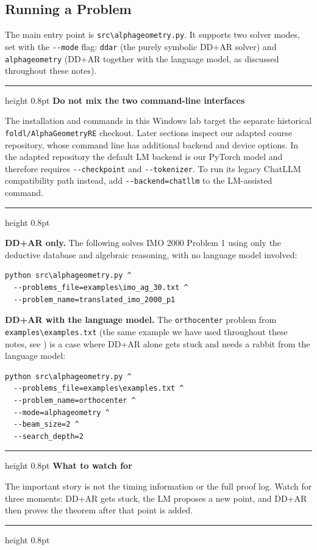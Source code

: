 \documentclass[reqno]{amsart}
\newenvironment{lecturebox}[1]{%
    \par\medskip
    \noindent\begingroup
    \setlength{\parindent}{0pt}
    \color{agblue}\hrule height 0.8pt\color{black}
    \smallskip
    \textbf{\color{agblue}#1}\par\smallskip
}{%
    \smallskip
    \color{agblue}\hrule height 0.8pt\color{black}
    \endgroup
    \medskip
}
\DeclareMathOperator{\1}{\textbf{1}}
\begin{document}
\subsection{Running a Problem}

The main entry point is \verb|src\alphageometry.py|. It supports two solver
modes, set with the \verb|--mode| flag: \verb|ddar| (the purely symbolic
DD+AR solver) and \verb|alphageometry| (DD+AR together with the language
model, as discussed throughout these notes).

\begin{lecturebox}{Do not mix the two command-line interfaces}
The installation and commands in this Windows lab target the separate
historical \texttt{foldl/AlphaGeometryRE} checkout.  Later sections inspect
our adapted course repository, whose command line has additional backend and
device options.  In the adapted repository the default LM backend is our
PyTorch model and therefore requires \verb|--checkpoint| and
\verb|--tokenizer|.  To run its legacy ChatLLM compatibility path instead,
add \verb|--backend=chatllm| to the LM-assisted command.
\end{lecturebox}

\textbf{DD+AR only.} The following solves IMO 2000 Problem 1 using only the
deductive database and algebraic reasoning, with no language model involved:
\begin{lstlisting}
python src\alphageometry.py ^
  --problems_file=examples\imo_ag_30.txt ^
  --problem_name=translated_imo_2000_p1
\end{lstlisting}

\textbf{DD+AR with the language model.} The \verb|orthocenter| problem from
\verb|examples\examples.txt| (the same example we have used throughout these
notes, see ) is a case where DD+AR alone gets stuck and needs
a rabbit from the language model:
\begin{lstlisting}
python src\alphageometry.py ^
  --problems_file=examples\examples.txt ^
  --problem_name=orthocenter ^
  --mode=alphageometry ^
  --beam_size=2 ^
  --search_depth=2
\end{lstlisting}

\begin{lecturebox}{What to watch for}
The important story is not the timing information or the full proof log. Watch
for three moments: DD+AR gets stuck, the LM proposes a new point, and DD+AR
then proves the theorem after that point is added.
\end{lecturebox}
\end{document}
